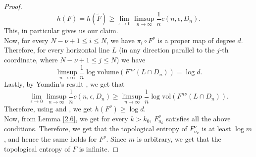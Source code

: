 \documentclass[12pt, reqno]{amsart}
\numberwithin{equation}{section}
\theoremstyle{definition}
\theoremstyle{remark}
\theoremstyle{plain}
\theoremstyle{definition}
\numberwithin{equation}{section}
\begin{document}
\begin{proof}
\begin{equation}\label{eq1}
h(F)=h(\widetilde{F})\geq \lim_{\epsilon\to 0}\limsup_{n\to\infty} \frac{1}{n}c(n,\epsilon,D_n).
\end{equation}
This, in particular gives us our claim. \\
Now, for every $N-\nu+1\leq i\leq N$, we have $\pi_i\circ F^{\nu}$ is a proper map of degree $d$. Therefore, for every horizontal line $L$ (in any direction parallel to the $j$-th coordinate, where $N-\nu+1\leq j\leq N$) we have
\begin{equation}\label{eq2}
\limsup_{n\to\infty} \frac{1}{n}\log \text{volume}(F^{n\nu}(L\cap D_n))=\log d.
\end{equation}
Lastly, by Yomdin's result \cite[Page no. 290-292]{Yomdin}, we get that
\[ \lim_{\epsilon\to 0}\limsup_{n\to\infty} \frac{1}{n}c(n,\epsilon,D_n)\geq \limsup_{n\to\infty} \frac{1}{n}\log \text{vol}(F^{n\nu}(L\cap D_n)). \]
Therefore, using  and , we get  $h(F^{\nu})\geq \log d.$ \\
Now, from Lemma \ref{2.6}, we get for every $k>k_0$, $F_{n_k}^{\nu}$ satisfies all the above conditions.  Therefore, we get that the topological entropy of $F_{n_k}^{\nu}$ is at least $\log m$, and hence the same holds for $F^{\nu}$. Since $m$ is arbitrary, we get that the topological entropy of $F$ is infinite.


\end{proof}
\end{document}
